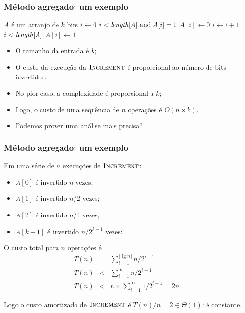 \documentclass{beamer}
\begin{document}
\begin{frame}

\frametitle{Método agregado: um exemplo}

  \begin{codebox}
    \zi \Comment $A$ é um arranjo de $k$ bits
    \li $i \gets 0$
    \li \While $i < \id{length}[A] \mbox{ and } A[i] = 1$
    \li \Do 
    \li   $A[i] \gets 0$
    \li   $i \gets i + 1$
        \End
    \li \If $i < \id{length}[A]$
    \li \Then
    \li    $A[i] \gets 1$
        \End
  \end{codebox}

\begin{itemize}
\item O tamanho da entrada é $k$;
\item O custo da execução da $\textnormal{\scshape Increment}$ é proporcional ao número de bits
  invertidos.
\item No pior caso, a complexidade é proporcional a $k$;
\item Logo, o custo de uma sequência de $n$ operações é $O(n \times k)$.
\item Podemos prover uma análise mais precisa?
\end{itemize}

\end{frame}

\begin{frame}

\frametitle{Método agregado: um exemplo}

Em uma série de $n$ execuções de $\textnormal{\scshape Increment}$:
\begin{itemize}
\item $A[0]$ é invertido $n$ vezes;
\item $A[1]$ é invertido $n/2$ vezes;
\item $A[2]$ é invertido $n/4$ vezes;
\item $A[k-1]$ é invertido $n/2^{k-1}$ vezes;
\end{itemize}
O custo total para $n$ operações é 
\begin{eqnarray*}
T(n) & = & \sum_{i=1}^{\lfloor \lg n \rfloor} n/2^{i-1} \\
T(n) & < & \sum_{i=1}^{\infty} n/2^{i-1} \\
T(n) & < & n \times \sum_{i=1}^{\infty} 1/2^{i-1} = 2n
\end{eqnarray*}

Logo o custo amortizado de $\textnormal{\scshape Increment}$ é $T(n)/n = 2 \in \Theta(1)$: é \alert{constante}.

\end{frame}
\end{document}
